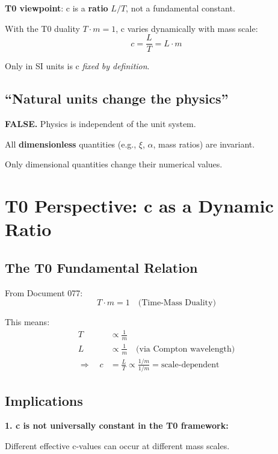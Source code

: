 	\textbf{T0 viewpoint}: c is a \textbf{ratio} $L/T$, not a fundamental constant.
	
	With the T0 duality $T \cdot m = 1$, c varies dynamically with mass scale:
	\begin{equation}
		c = \frac{L}{T} = L \cdot m
	\end{equation}
	
	Only in SI units is c \emph{fixed by definition}.
	
	\subsection{``Natural units change the physics''}
	
	\textbf{FALSE.} Physics is independent of the unit system.
	
	All \textbf{dimensionless} quantities (e.g., $\xi$, $\alpha$, mass ratios) are invariant.
	
	Only dimensional quantities change their numerical values.
	
	\section{T0 Perspective: c as a Dynamic Ratio}
	
	\subsection{The T0 Fundamental Relation}
	
	From Document 077:
	\begin{equation}
		T \cdot m = 1 \quad \text{(Time-Mass Duality)}
	\end{equation}
	
	This means:
	\begin{align}
		T &\propto \frac{1}{m} \\
		L &\propto \frac{1}{m} \quad \text{(via Compton wavelength)} \\
		\Rightarrow \quad c &= \frac{L}{T} \propto \frac{1/m}{1/m} = \text{scale-dependent}
	\end{align}
	
	\subsection{Implications}
	
	\textbf{1. c is not universally constant in the T0 framework:}
	
	Different effective c-values can occur at different mass scales.
	

